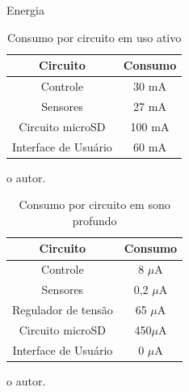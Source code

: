 \begin{frame}{Energia}

	\begin{table}[!h]
	\captionsetup{width=9cm}%
	\caption{\label{tab:consumos_circuitos} Consumo por circuito em uso ativo}%
% 	
		\begin{tabular}{cc}
			\toprule
			Circuito & Consumo \\
			\midrule \midrule
			Controle  &  30  mA \\
			Sensores  &  27 mA  \\
			Circuito microSD   &   100 mA\\
			Interface de Usuário & 60 mA\\
		    \bottomrule
		\end{tabular}%
	{%
	\tiny{o autor.}%
    }
    \end{table}

	\begin{table}[!h]
	\captionsetup{width=9cm}%
	\caption{\label{tab:consumos_sono_profundo} Consumo por circuito em sono profundo}%
% 	
		\begin{tabular}{cc}
			\toprule
			Circuito & Consumo \\
			\midrule \midrule
			Controle  &  8 $\mu$A \\
			Sensores  &  0,2 $\mu$A  \\
			Regulador de tensão  & 65 $\mu$A\\
			Circuito microSD & 450$\mu$A \\
			Interface de Usuário & 0 $\mu$A \\
		    \bottomrule
		\end{tabular}%
	{%
	\tiny{o autor.}%
    }
    \end{table}


    
\end{frame}


